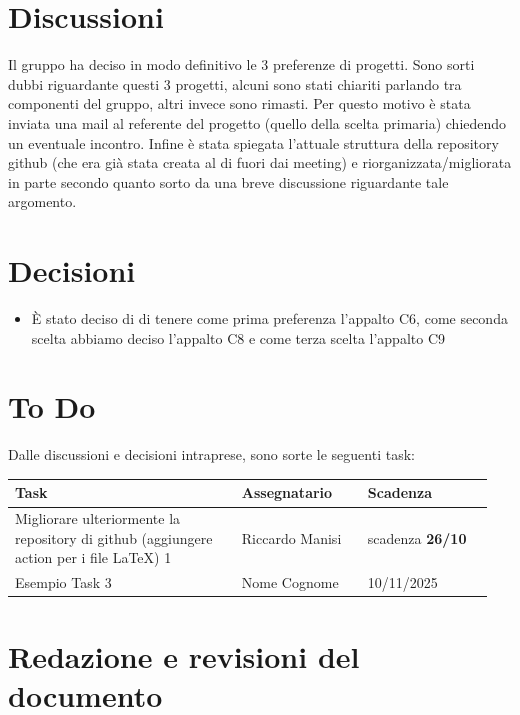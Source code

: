 \documentclass[a4paper,12pt]{article}
\begin{document}
\section{Discussioni}
Il gruppo ha deciso in modo definitivo le 3 preferenze di progetti. Sono sorti dubbi riguardante questi 3 progetti, alcuni sono stati chiariti parlando tra componenti del gruppo, altri invece sono rimasti. Per questo motivo è stata inviata una mail al referente del progetto (quello della scelta primaria) chiedendo un eventuale incontro. Infine è stata spiegata l'attuale struttura della repository github (che era già stata creata al di fuori dai meeting) e riorganizzata/migliorata in parte secondo quanto sorto da una breve discussione riguardante tale argomento.

\section{Decisioni}
\begin{itemize}
    \item È stato deciso di di tenere come prima preferenza l'appalto C6, come seconda scelta abbiamo deciso l'appalto C8 e come terza scelta l'appalto C9
\end{itemize}

\section{To Do}
Dalle discussioni e decisioni intraprese, sono sorte le seguenti task:

\begin{center}
\small
\renewcommand{\arraystretch}{1.2} 
\begin{tabular}{|p{0.45\linewidth}|p{0.25\linewidth}|p{0.25\linewidth}|}
\hline
\rowcolor{gray!60} 
\textbf{Task} & \textbf{Assegnatario} & \textbf{Scadenza} \\
\hline
\rowcolor{white}
Migliorare ulteriormente la repository di github (aggiungere action per i file LaTeX) 1 & Riccardo Manisi & scadenza \textbf{26/10} \\
\hline
\rowcolor{white}
Esempio Task 3 & Nome Cognome & 10/11/2025 \\
\hline
\end{tabular}
\end{center}

\clearpage
\section{Redazione e revisioni del documento}
\end{document}
